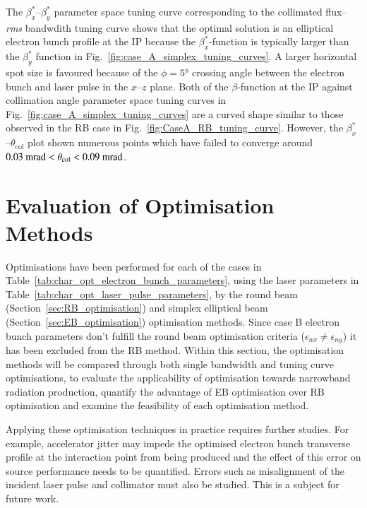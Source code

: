 \documentclass[../main.tex]{subfiles}
\begin{document}
The $\beta_{x}^{*}$--$\beta_{y}^{*}$ parameter space tuning curve corresponding to the collimated flux--\textit{rms} bandwdith tuning curve shows that the optimal solution is an elliptical electron bunch profile at the IP because the $\beta_{x}^{*}$-function is typically larger than the $\beta_{y}^{*}$ function in Fig.~\ref{fig:case_A_simplex_tuning_curves}. A larger horizontal spot size is favoured because of the $\phi = 5$\si{\degree} crossing angle between the electron bunch and laser pulse in the $x$--$z$ plane. Both of the $\beta$-function at the IP against collimation angle parameter space tuning curves in Fig.~\ref{fig:case_A_simplex_tuning_curves} are a curved shape similar to those observed in the RB case in Fig.~\ref{fig:CaseA_RB_tuning_curve}. However, the $\beta_{x}^{*}$--$\theta_{\mathrm{col}}$ plot shown numerous points which have failed to converge around $0.03~\textrm{\si{\milli\radian}} < \theta_{\mathrm{col}} < 0.09~\mathrm{\si{\milli\radian}}$. 

\section{Evaluation of Optimisation Methods} 
\label{sec:evaluation_of_optimisation_methods}

Optimisations have been performed for each of the cases in Table~\ref{tab:char_opt_electron_bunch_parameters}, using the laser parameters in Table~\ref{tab:char_opt_laser_pulse_parameters}, by the round beam (Section~\ref{sec:RB_optimisation}) and simplex elliptical beam (Section~\ref{sec:EB_optimisation}) optimisation methods. Since case B electron bunch parameters don't fulfill the round beam optimisation criteria ($\epsilon_{nx}\neq\epsilon_{ny}$) it has been excluded from the RB method. Within this section, the optimisation methods will be compared through both single bandwidth and tuning curve optimisations, to evaluate the applicability of optimisation towards narrowband radiation production, quantify the advantage of EB optimisation over RB optimisation and examine the feasibility of each optimisation method. 

Applying these optimisation techniques in practice requires further studies. For example, accelerator jitter may impede the optimised electron bunch transverse profile at the interaction point from being produced and the effect of this error on source performance needs to be quantified. Errors such as misalignment of the incident laser pulse and collimator must also be studied. This is a subject for future work.  
\end{document}
